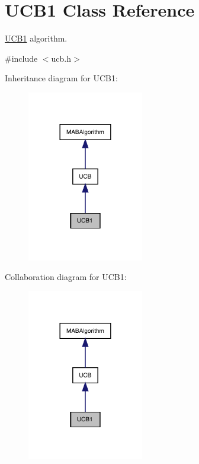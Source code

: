 \hypertarget{class_u_c_b1}{}\section{U\+C\+B1 Class Reference}
\label{class_u_c_b1}


\mbox{\hyperlink{class_u_c_b1}{U\+C\+B1}} algorithm.  




{\ttfamily \#include $<$ucb.\+h$>$}



Inheritance diagram for U\+C\+B1\+:
\nopagebreak
\begin{figure}[H]
\begin{center}
\leavevmode
\includegraphics[width=144pt]{class_u_c_b1__inherit__graph}
\end{center}
\end{figure}


Collaboration diagram for U\+C\+B1\+:
\nopagebreak
\begin{figure}[H]
\begin{center}
\leavevmode
\includegraphics[width=144pt]{class_u_c_b1__coll__graph}
\end{center}
\end{figure}
